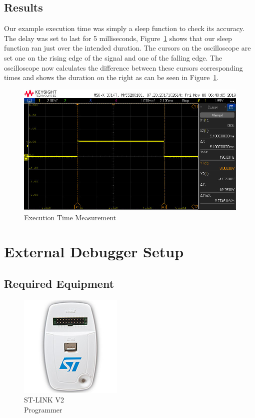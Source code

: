 \documentclass{article}
\begin{document}
  \subsection{Results}

  Our example execution time was simply a sleep function to check its accuracy.
  The delay was set to last for 5 milliseconds,
  Figure~\ref{fig:exectime_measure} shows that our sleep function ran just over
  the intended duration. The cursors on the oscilloscope are set one on the
  rising edge of the signal and one of the falling edge. The oscilloscope now
  calculates the difference between these cursors corresponding times and shows
  the duration on the right as can be seen in Figure~\ref{fig:exectime_measure}.

  \begin{figure}[h]
    \includegraphics[width=\textwidth]{images/exec_time/exec_time.jpg}
    \caption{Execution Time Measurement}
    \label{fig:exectime_measure}
  \end{figure}

  \section{External Debugger Setup}

  \subsection{Required Equipment}

  \begin{figure}
    \includegraphics[width=30ex]{images/programming/stlinkv2.jpg}
    \caption{ST-LINK V2 \\ Programmer}
  \end{figure}
\end{document}
